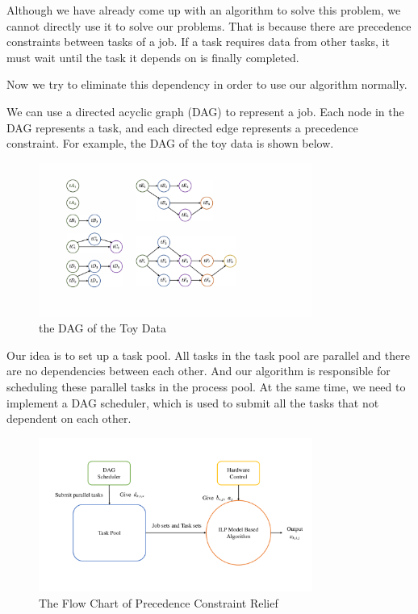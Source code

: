 \documentclass{llncs}
\begin{document}
Although we have already come up with an algorithm to solve this problem, we cannot directly use it to solve our problems. That is because there are precedence constraints between tasks of a job. If a task requires data from other tasks, it must wait until the task it depends on is finally completed.

Now we try to eliminate this dependency in order to use our algorithm normally.

We can use a directed acyclic graph (DAG) to represent a job. Each node in the DAG represents a task, and each directed edge represents a precedence constraint. For example, the DAG of the toy data is shown below.

\begin{figure}[H]
    \includegraphics[width=0.8\textwidth]{DAG.pdf}
    \centering
    \caption{the DAG of the Toy Data} 
    \end{figure}

Our idea is to set up a task pool. All tasks in the task pool are parallel and there are no dependencies between each other. And our algorithm is responsible for scheduling these parallel tasks in the process pool. At the same time, we need to implement a DAG scheduler, which is used to submit all the tasks that not dependent on each other.

\begin{figure}[H]
    \includegraphics[width=0.8\textwidth]{Flow-Chart.pdf}
    \centering
    \caption{The Flow Chart of Precedence Constraint Relief} 
    \end{figure}
\end{document}
